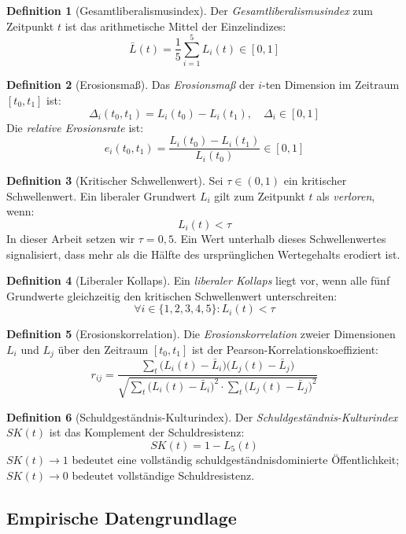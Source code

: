 ﻿\documentclass[a4paper,12pt]{article}
\theoremstyle{definition}
\newtheorem{definition}{Definition}
\begin{document}
\begin{definition}[Gesamtliberalismusindex]
Der \emph{Gesamtliberalismusindex} zum Zeitpunkt $t$ ist das arithmetische Mittel der Einzelindizes:
\[
\bar{L}(t) = \frac{1}{5} \sum_{i=1}^{5} L_i(t) \in [0,1]
\]
\end{definition}

\begin{definition}[Erosionsmaß]
Das \emph{Erosionsmaß} der $i$-ten Dimension im Zeitraum $[t_0, t_1]$ ist:
\[
\Delta_i(t_0, t_1) = L_i(t_0) - L_i(t_1), \quad \Delta_i \in [0,1]
\]
Die \emph{relative Erosionsrate} ist:
\[
e_i(t_0, t_1) = \frac{L_i(t_0) - L_i(t_1)}{L_i(t_0)} \in [0,1]
\]
\end{definition}

\begin{definition}[Kritischer Schwellenwert]
Sei $\tau \in (0,1)$ ein kritischer Schwellenwert. Ein liberaler Grundwert $L_i$ gilt zum Zeitpunkt $t$ als \emph{verloren}, wenn:
\[
L_i(t) < \tau
\]
In dieser Arbeit setzen wir $\tau = 0{,}5$. Ein Wert unterhalb dieses Schwellenwertes signalisiert, dass mehr als die Hälfte des ursprünglichen Wertegehalts erodiert ist.
\end{definition}

\begin{definition}[Liberaler Kollaps]
Ein \emph{liberaler Kollaps} liegt vor, wenn alle fünf Grundwerte gleichzeitig den kritischen Schwellenwert unterschreiten:
\[
\forall i \in \{1, 2, 3, 4, 5\}: L_i(t) < \tau
\]
\end{definition}

\begin{definition}[Erosionskorrelation]
Die \emph{Erosionskorrelation} zweier Dimensionen $L_i$ und $L_j$ über den Zeitraum $[t_0, t_1]$ ist der Pearson-Korrelationskoeffizient:
\[
r_{ij} = \frac{\sum_t \bigl(L_i(t) - \bar{L}_i\bigr)\bigl(L_j(t) - \bar{L}_j\bigr)}
{\sqrt{\sum_t \bigl(L_i(t) - \bar{L}_i\bigr)^2 \cdot \sum_t \bigl(L_j(t) - \bar{L}_j\bigr)^2}}
\]
\end{definition}

\begin{definition}[Schuldgeständnis-Kulturindex]
Der \emph{Schuldgeständnis-Kulturindex} $SK(t)$ ist das Komplement der Schuldresistenz:
\[
SK(t) = 1 - L_5(t)
\]
$SK(t) \to 1$ bedeutet eine vollständig schuldgeständnisdominierte Öffentlichkeit; $SK(t) \to 0$ bedeutet vollständige Schuldresistenz.
\end{definition}

\subsection{Empirische Datengrundlage}
\end{document}
